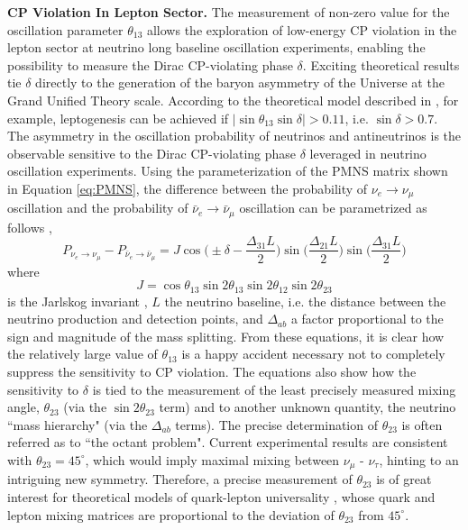 \textbf{CP Violation In Lepton Sector.} The measurement of non-zero value for the oscillation parameter $\theta_{13}$ allows the exploration of low-energy CP violation in the lepton sector at neutrino long baseline oscillation experiments, enabling the possibility to measure the Dirac CP-violating phase $\delta$. Exciting theoretical results tie $\delta$ directly to the generation of the baryon asymmetry of the Universe at the Grand Unified Theory scale. According to the theoretical model described in \cite{PASCOLI20071}, for example, leptogenesis can be achieved if $|\sin\theta_{13} \sin \delta| > 0.11$, i.e. $\sin \delta > 0.7$.\\
The asymmetry in the oscillation probability of neutrinos and antineutrinos is the observable sensitive to the Dirac CP-violating phase $\delta$ leveraged in neutrino oscillation experiments. Using the parameterization of the PMNS matrix shown in Equation \ref{eq:PMNS},  the difference between the probability of $\nu_e \rightarrow \nu_\mu$ oscillation and the probability of $\bar\nu_e \rightarrow \bar\nu_\mu$ oscillation can be parametrized as follows \cite{Cervera2000},
\begin{equation}
P_{\nu_e\rightarrow\nu_\mu} - P_{\bar\nu_e\rightarrow\bar\nu_\mu} = J \cos\Big(\pm\delta - \frac{\Delta_{31}L}{2}\Big) \sin\Big(\frac{\Delta_{21}L}{2}\Big)\sin\Big(\frac{\Delta_{31}L }{2}\Big)
\end{equation}
where 
\begin{equation}
J = \cos\theta_{13}\sin2\theta_{13}\sin2\theta_{12}\sin2\theta_{23}
\end{equation}
is the Jarlskog invariant \cite{Jarlskog1985}, $L$ the neutrino baseline, i.e. the distance between the neutrino production and detection points, and $\Delta_{ab}$ a factor proportional to the sign and magnitude of the mass splitting. 
From these equations, it is clear how the relatively  large value of $\theta_{13}$ is a happy accident necessary not to completely suppress the sensitivity to CP violation.  The equations also show how the sensitivity to $\delta$ is tied to the measurement of the least precisely measured mixing angle,  $\theta_{23}$ (via the $\sin2\theta_{23}$ term) and to another unknown quantity, the neutrino ``mass hierarchy" (via the $\Delta_{ab}$ terms). The precise determination of $\theta_{23}$ is often referred as to ``the octant problem". Current experimental results \cite{PhysRevLett.118.151801,PhysRevLett.118.231801} are consistent with  $\theta_{23}=45^\circ$, which would imply maximal mixing between $\nu_\mu$ - $\nu_\tau$, hinting to an intriguing new symmetry. Therefore, a precise measurement of $\theta_{23}$  is of great interest for theoretical models of quark-lepton universality \cite{PhysRevLett.93.161801,PhysRevD.70.073009,0295-5075-103-2-21001}, whose  quark and lepton mixing matrices are proportional to the deviation of $\theta_{23}$ from $45^\circ$. 


